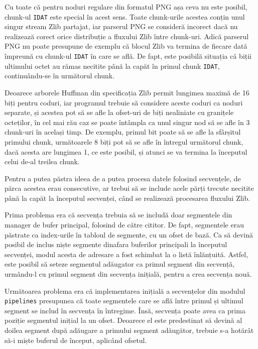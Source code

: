 \documentclass[a4paper,12pt]{report}
\begin{document}
Cu toate că pentru noduri regulare din formatul \ac{PNG} așa ceva nu este posibil,
chunk-ul \texttt{IDAT} este special în acest sens.
Toate chunk-urile acestea conțin unul singur stream Zlib partajat,
iar parserul \ac{PNG} se consideră incorect dacă nu realizează corect
orice distribuție a fluxului Zlib între chunk-uri.
Adică parserul \ac{PNG} nu poate presupune de exemplu că blocul Zlib va termina de fiecare dată
împreună cu chunk-ul \texttt{IDAT} în care se află.
De fapt, este posibilă situația că biții ultimului octet au rămas necitite până la capăt
în primul chunk \texttt{IDAT}, continuându-se în următorul chunk.

Deoarece arborele Huffman din specificația Zlib permit lungimea maximă de 16 biți pentru coduri,
iar programul trebuie să considere aceste coduri ca noduri separate,
și acestea pot să se afle la ofset-uri de biți nealiniate cu granițele octeților,
în cel mai rău caz se poate întâmpla ca unul singur nod să se afle în 3 chunk-uri în același timp.
De exemplu, primul bit poate să se afle la sfârșitul primului chunk,
următoarele 8 biți pot să se afle în întregul următorul chunk, dacă acesta are lungimea 1, ce este posibil,
și atunci se va termina la începutul celui de-al treilea chunk.

Pentru a putea păstra ideea de a putea procesa datele folosind secvențele,
de părca acestea erau consecutive, ar trebui să se include acele părți trecute necitite până la capăt
la începutul secvenței, când se realizează procesarea fluxului Zlib.

Prima problema era că secvența trebuia să se includă doar segmentele din manager de bufer principal,
folosind de către cititor.
De fapt, segmentele erau păstrate ca index-urile în tabloul de segmente, cu un ofset de bază.
Ca să devină posibil de inclus niște segmente dinafara buferilor principali la începutul secvenței,
modul acesta de adresare a fost schimbat la o listă înlănțuită.
Astfel, este posibil să seteze segmentul adăugator ca primul segment din secvență, urmându-l cu
primul segment din secvența inițială, pentru a crea secvența nouă.

Următoarea problema era că implementarea inițială a secvențelor din modulul \texttt{pipelines} presupunea
că toate segmentele care se află între primul și ultimul segment se includ în secvența în întregime.
Însă, secvența poate avea ca prima poziție segmentul inițial la un ofset.
Deoarece el este predestinat să devină al doilea segment după adăugare a primului segment adăugător,
trebuie s-a hotărât să-i miște buferul de început, aplicând ofsetul.
\end{document}
